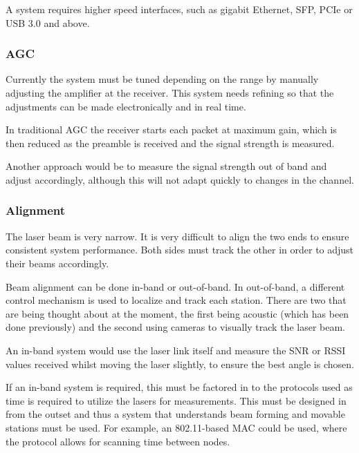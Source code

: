 A system requires higher speed interfaces, such as gigabit Ethernet,
\ac{SFP}, \ac{PCIe} or \ac{USB} 3.0 and above.

\subsubsection{\ac{AGC}}
Currently the system must be tuned depending on the range by manually
adjusting the amplifier at the receiver. This system needs refining so that
the adjustments can be made electronically and in real time.

In traditional \ac{AGC} the receiver starts each packet at maximum gain,
which is then reduced as the preamble is received and the signal strength
is measured.

Another approach would be to measure the signal strength out of band and
adjust accordingly, although this will not adapt quickly to changes in the
channel.

\subsubsection{Alignment}
The laser beam is very narrow. It is very difficult to align the two ends
to ensure consistent system performance. Both sides must track the other in
order to adjust their beams accordingly.

Beam alignment can be done in-band or out-of-band. In out-of-band, a different
control mechanism is used to localize and track each station. There are two
that are being thought about at the moment, the first being acoustic (which
has been done previously) and the second using cameras to visually track the
laser beam.

An in-band system would use the laser link itself and measure the \ac{SNR} or
\ac{RSSI} values received whilst moving the laser slightly, to ensure the best
angle is chosen.

If an in-band system is required, this must be factored in to the protocols
used as time is required to utilize the lasers for measurements. This must
be designed in from the outset and thus a system that understands beam forming
and movable stations must be used. For example, an 802.11-based \ac{MAC} could
be used, where the protocol allows for scanning time between nodes.
